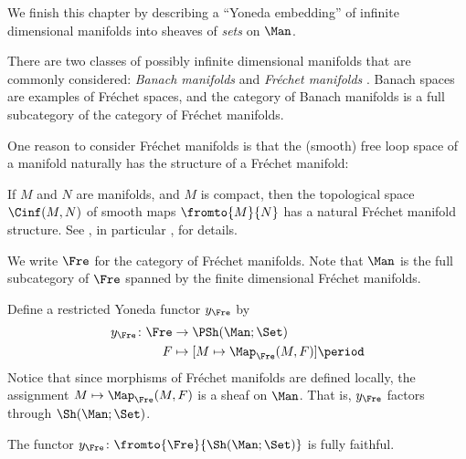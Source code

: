 We finish this chapter by describing a ``Yoneda embedding'' of infinite dimensional manifolds into sheaves of \textit{sets} on $ \Man $.

\begin{recollection}
	There are two classes of possibly infinite dimensional manifolds that are commonly considered: \emph{Banach manifolds} and \emph{Fréchet manifolds} \cites[Chapter III, \S1]{MR0341518}[\S I.4]{MR656198}.  
	Banach spaces are examples of Fréchet spaces, and the category of Banach manifolds is a full subcategory of the
	category of Fréchet manifolds. 
\end{recollection}

One reason to consider Fréchet manifolds is that the (smooth) free loop space of a manifold naturally has the structure of a Fréchet manifold:

\begin{example}\label{ex:mappingFrechet}
	If $ M $ and $ N $ are manifolds, and $ M $ is compact, then the topological space $ \Cinf(M,N) $ of smooth maps $ \fromto{M}{N} $ has a natural Fréchet manifold structure.  
	See \cite[Chapter III, §1]{MR0341518}, in particular \cite[Chapter III, Theorem 1.11]{MR0341518}, for details.
\end{example}

\begin{notation}
	We write $ \Fre $ for the category of Fréchet manifolds.
	Note that $ \Man $ is the full subcategory of $ \Fre $ spanned by the finite dimensional Fréchet manifolds.
\end{notation}

\begin{construction}\label{construction:embedBanFre}
	Define a restricted Yoneda functor $ y_{\Fre} $ by
	\begin{align*}
		y_{\Fre} \colon \Fre &\to \PSh(\Man;\Set) \\
		F &\mapsto [M \mapsto \Map_{\Fre}(M,F)] \period
	\end{align*}
	Notice that since morphisms of Fréchet manifolds are defined locally, the assignment $ M \mapsto \Map_{\Fre}(M,F) $ is a sheaf on $ \Man $.
	That is, $ y_{\Fre} $ factors through $ \Sh(\Man;\Set) $.
\end{construction}

\begin{theorem}
	The functor $ y_{\Fre} \colon \fromto{\Fre}{\Sh(\Man;\Set)} $ is fully faithful. 
\end{theorem}

